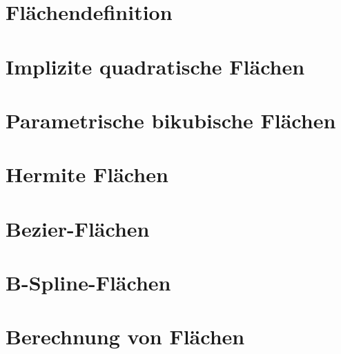 \section{Flächendefinition}

\section{Implizite quadratische Flächen}

\section{Parametrische bikubische Flächen}

\section{Hermite Flächen}

\section{Bezier-Flächen}

\section{B-Spline-Flächen}

\section{Berechnung von Flächen}



